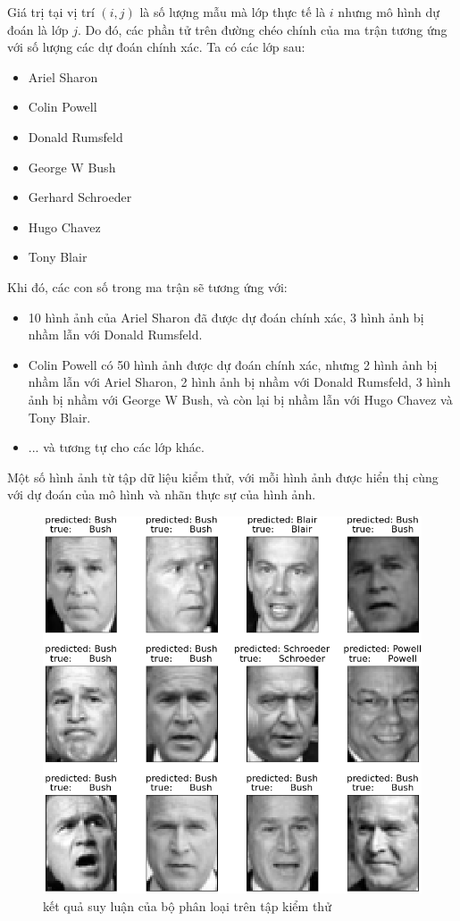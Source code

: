 \documentclass[12pt,a4paper,oneside]{report}
\numberwithin{equation}{section}
\begin{document}
Giá trị tại vị trí $(i, j)$ là số lượng mẫu mà lớp thực tế là $i$ nhưng mô hình dự đoán là lớp $j$. Do đó, các phần tử trên đường chéo chính của ma trận tương ứng với số lượng các dự đoán chính xác.
Ta có các lớp sau:

\begin{itemize}
	\item Ariel Sharon
	\item Colin Powell
	\item Donald Rumsfeld
	\item George W Bush
	\item Gerhard Schroeder
	\item Hugo Chavez
	\item Tony Blair
\end{itemize}
Khi đó, các con số trong ma trận sẽ tương ứng với:

\begin{itemize}
	\item 10 hình ảnh của Ariel Sharon đã được dự đoán chính xác, 3 hình ảnh bị nhầm lẫn với Donald Rumsfeld.
	\item Colin Powell có 50 hình ảnh được dự đoán chính xác, nhưng 2 hình ảnh bị nhầm lẫn với Ariel Sharon, 2 hình ảnh bị nhầm với Donald Rumsfeld, 3 hình ảnh bị nhầm với George W Bush, và còn lại bị nhầm lẫn với Hugo Chavez và Tony Blair.
	\item ... và tương tự cho các lớp khác.
\end{itemize}

Một số hình ảnh từ tập dữ liệu kiểm thử, với mỗi hình ảnh được hiển thị cùng với dự đoán của mô hình và nhãn thực sự của hình ảnh.

\begin{figure}[htp]
	\centering
	\includegraphics[scale=0.8]{predict_pca.png}
	\caption{kết quả suy luận của bộ phân loại trên tập kiểm thử}
	\label{fig:output}
\end{figure}
\newpage
\end{document}
